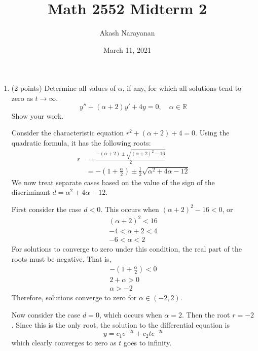\documentclass[11pt, titlepage]{article}
\title{Math 2552 Midterm 2}
\author{Akash Narayanan}
\date{March 11, 2021}
\begin{document}
    \maketitle

    \begin{enumerate}
        \item (2 points) Determine all values of $\alpha$, if any, for which all
            solutions tend to zero as $t \to \infty$.
            \[
                y'' + (\alpha + 2) y' + 4y = 0, \quad \alpha \in \mathbb{R}
            \] 
            Show your work.

            \begin{solution}
                Consider the characteristic equation $r^2 + (\alpha + 2) + 4 =
                0$. Using the quadratic formula, it has the following roots:
                \begin{align*}
                    r &= \frac{-(\alpha + 2) \pm \sqrt{(\alpha + 2)^2 - 16}}{2}
                    \\
                      &= -(1 + \frac{\alpha}{2}) \pm \frac{1}{2} \sqrt{\alpha^2
                      + 4\alpha - 12}
                \end{align*}
                We now treat separate cases based on the value of the sign of
                the discriminant $d = \alpha^2 + 4\alpha - 12$.

                First consider the case $d < 0$. This occurs when $(\alpha +
                2)^2 - 16 < 0$, or
                \begin{gather*}
                    (\alpha + 2)^2 < 16 \\
                    -4 < \alpha + 2 < 4 \\
                    -6 < \alpha < 2
                \end{gather*}
                For solutions to converge to zero under this condition, the real
                part of the roots must be negative. That is, 
                \begin{gather*}
                    -(1 + \frac{\alpha}{2}) < 0 \\
                    2 + \alpha > 0 \\
                    \alpha > -2
                \end{gather*}
                Therefore, solutions converge to zero for $\alpha \in (-2, 2)$.

                Now consider the case $d = 0$, which occurs when $\alpha = 2$.
                Then the root $r = -2$. Since this is the only root, the
                solution to the differential equation is
                 \[
                y = c_1 e^{-2t} + c_2 t e^{-2t}
                \] 
                which clearly converges to zero as $t$ goes to infinity.


\end{solution}
\end{enumerate}
\end{document}
